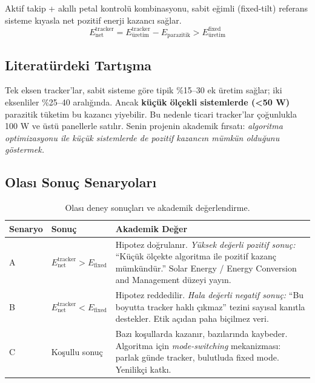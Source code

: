 \documentclass[11pt,a4paper]{article}
\begin{document}
\begin{infobox}
Aktif takip + akıllı petal kontrolü kombinasyonu, sabit eğimli (fixed-tilt) referans sisteme kıyasla net pozitif enerji kazancı sağlar.
\[
E_{\text{net}}^{\text{tracker}} = E_{\text{üretim}}^{\text{tracker}} - E_{\text{parazitik}} > E_{\text{üretim}}^{\text{fixed}}
\]
\end{infobox}

\subsection{Literatürdeki Tartışma}

Tek eksen tracker'lar, sabit sisteme göre tipik \%15--30 ek üretim sağlar; iki eksenliler \%25--40 aralığında. Ancak \textbf{küçük ölçekli sistemlerde (<50 W)} parazitik tüketim bu kazancı yiyebilir. Bu nedenle ticari tracker'lar çoğunlukla 100 W ve üstü panellerle satılır. Senin projenin akademik fırsatı: \textit{algoritma optimizasyonu ile küçük sistemlerde de pozitif kazancın mümkün olduğunu göstermek.}

\subsection{Olası Sonuç Senaryoları}

\begin{table}[h]
\centering
\renewcommand{\arraystretch}{1.3}
\begin{tabular}{|p{2cm}|p{4cm}|p{8cm}|}
\hline
\rowcolor{primary!15}
\textbf{Senaryo} & \textbf{Sonuç} & \textbf{Akademik Değer} \\
\hline
A & $E_{\text{net}}^{\text{tracker}} > E_{\text{fixed}}$ & Hipotez doğrulanır. \textit{Yüksek değerli pozitif sonuç:} ``Küçük ölçekte algoritma ile pozitif kazanç mümkündür.'' Solar Energy / Energy Conversion and Management düzeyi yayın. \\
\hline
B & $E_{\text{net}}^{\text{tracker}} < E_{\text{fixed}}$ & Hipotez reddedilir. \textit{Hala değerli negatif sonuç:} ``Bu boyutta tracker haklı çıkmaz'' tezini sayısal kanıtla destekler. Etik açıdan paha biçilmez veri. \\
\hline
C & Koşullu sonuç & Bazı koşullarda kazanır, bazılarında kaybeder. Algoritma için \textit{mode-switching} mekanizması: parlak günde tracker, bulutluda fixed mode. Yenilikçi katkı. \\
\hline
\end{tabular}
\caption{Olası deney sonuçları ve akademik değerlendirme.}
\end{table}
\end{document}
